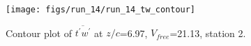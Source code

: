 \begin{figure}[H]
\centering
\texttt{[image: figs/run\_14/run\_14\_tw\_contour]}
\caption{Contour plot of $\overline{t^\prime w^\prime}$ at $z/c$=6.97, $V_{free}$=21.13, station 2.}
\label{fig:run_14_tw_contour}
\end{figure}


